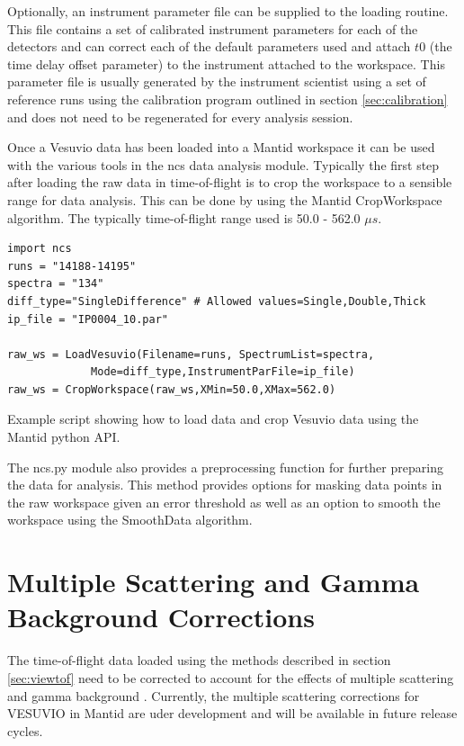 \documentclass[paper=a4, fontsize=11pt]{scrartcl}	%
\numberwithin{equation}{section}															%
\numberwithin{figure}{section}																%
\numberwithin{table}{section}
\begin{document}
Optionally, an instrument parameter file can be supplied to the loading routine. This file contains a set of calibrated instrument parameters for each of the detectors and can correct each of the default parameters used and attach $t0$ (the time delay offset parameter) \cite{mayers2011calibration} to the instrument attached to the workspace. This parameter file is usually generated by the instrument scientist using a set of reference runs using the calibration program outlined in section \ref{sec:calibration} and does not need to be regenerated for every analysis session. 

Once a Vesuvio data has been loaded into a Mantid workspace it can be used with the various tools in the ncs data analysis module. Typically the first step after loading the raw data in time-of-flight is to crop the workspace to a sensible range for data analysis. This can be done by using the Mantid CropWorkspace algorithm. The typically time-of-flight range used is 50.0 - 562.0 $\mu s$.

\begin{listing}[H]
\begin{verbatim}
import ncs
runs = "14188-14195"
spectra = "134"
diff_type="SingleDifference" # Allowed values=Single,Double,Thick
ip_file = "IP0004_10.par"

raw_ws = LoadVesuvio(Filename=runs, SpectrumList=spectra,
		     Mode=diff_type,InstrumentParFile=ip_file)
raw_ws = CropWorkspace(raw_ws,XMin=50.0,XMax=562.0)
\end{verbatim}
\caption{Example script showing how to load data and crop Vesuvio data using the Mantid python API.}
\label{lst:loading-data}
\end{listing}

The ncs.py module also provides a preprocessing function for further preparing the data for analysis. This method provides options for masking data points in the raw workspace given an error threshold as well as an option to smooth the workspace using the SmoothData algorithm.

\section{Multiple Scattering and Gamma Background Corrections}
\label{sec:corrections}
The time-of-flight data loaded using the methods described in section \ref{sec:viewtof} need to be corrected to account for the effects of multiple scattering \citep{mayers2002multiple} and gamma background \citep{mayers2011calculation}. Currently, the multiple scattering corrections for VESUVIO in Mantid are uder development and will be available in future release cycles.
\end{document}
